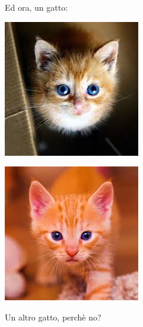 \documentclass{article}
\begin{document}
\begin{minipage}[left]{.5\linewidth}
	\centering Ed ora, un gatto: \\
  	\begin{center}
  		\includegraphics[width= .5\linewidth]{cat1}
  		\label{img:cat1}
  	\end{center}
  	
\end{minipage}
\begin{minipage}{.5\linewidth}
  	\begin{center}
  		\includegraphics[width= .5\linewidth]{cat2}
  		\label{img:cat2}
  	\end{center}
    	\centering Un altro gatto, perchè no?
\end{minipage}
\end{document}
